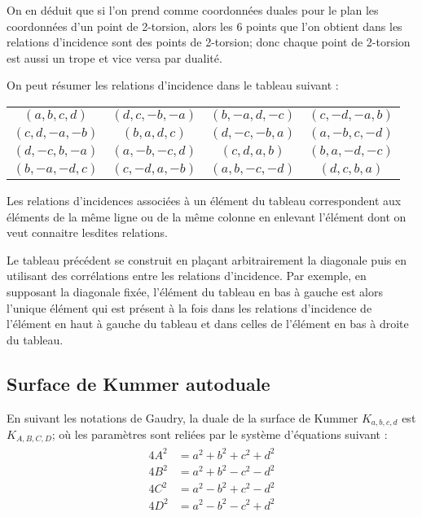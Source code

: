 \documentclass[a4paper,12pt]{article}
\theoremstyle{definition}
\theoremstyle{remark}
\numberwithin{equation}{section}
\begin{document}
On en déduit que si l'on prend comme coordonnées duales pour le plan les coordonnées d'un point de 2-torsion, alors les 6 points que l'on obtient dans les relations d'incidence sont des points de 2-torsion; donc chaque point de 2-torsion est aussi un trope et vice versa par dualité.

On peut résumer les relations d'incidence dans le tableau suivant :
\begin{center}
\begin{tabular}{ c c c c }
   $(a,b,c,d)$   & $(d,c,-b,-a)$ & $(b,-a,d,-c)$ & $(c,-d,-a,b)$ \\
   $(c,d,-a,-b)$ & $(b,a,d,c)$ & $(d,-c,-b,a)$ & $(a,-b,c,-d)$ \\
   $(d,-c,b,-a)$ & $(a,-b,-c,d)$ & $(c,d,a,b)$ & $(b,a,-d,-c)$ \\
   $(b,-a,-d,c)$ &  $(c,-d,a,-b)$ & $(a,b,-c,-d)$ & $(d, c, b, a)$
 \end{tabular}
\end{center}

Les relations d'incidences associées à un élément du tableau correspondent aux éléments de la même ligne ou de la même colonne en enlevant l'élément dont on veut connaitre lesdites relations.

Le tableau précédent se construit en plaçant arbitrairement la diagonale puis en utilisant des corrélations entre les relations d'incidence. Par exemple, en supposant la diagonale fixée, l'élément du tableau en bas à gauche est alors l'unique élément qui est présent à la fois dans les relations d'incidence de l'élément en haut à gauche du tableau et dans celles de l'élément en bas à droite du tableau.

\subsection{Surface de Kummer autoduale}

En suivant les notations de Gaudry, la duale de la surface de Kummer $K_{a,b,c,d}$ est $K_{A,B,C,D}$; où les paramètres sont reliées par le système d'équations suivant \citep{gaudry} :
\begin{align}
\begin{split}
\label{constDual}
4A^2 &= a^2 + b^2 + c^2 + d^2 \\
4B^2 &= a^2 + b^2 - c^2 - d^2 \\
4C^2 &= a^2 - b^2 + c^2 - d^2 \\
4D^2 &= a^2 - b^2 - c^2 + d^2
\end{split}
\end{align}
\end{document}
